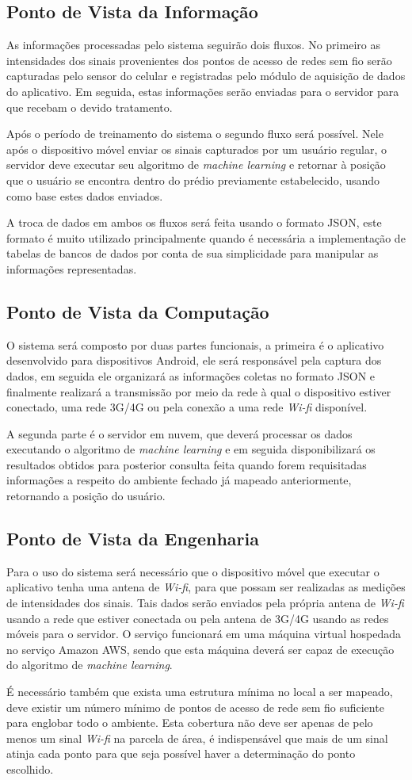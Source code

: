 \subsection{Ponto de Vista da Informação}
As informações processadas pelo sistema seguirão dois fluxos. No primeiro as intensidades dos sinais provenientes dos pontos de acesso de redes sem fio serão capturadas pelo sensor do celular e registradas pelo módulo de aquisição de dados do aplicativo. Em seguida, estas informações serão enviadas para o servidor para que recebam o devido tratamento.\par
Após o período de treinamento do sistema o segundo fluxo será possível. Nele após o dispositivo móvel enviar os sinais capturados por um usuário regular, o servidor deve executar seu algoritmo de \textit{machine learning} e retornar à posição que o usuário se encontra dentro do prédio previamente estabelecido, usando como base estes dados enviados.\par
A troca de dados em ambos os fluxos será feita usando o formato JSON, este formato é muito utilizado principalmente quando é necessária a implementação de tabelas de bancos de dados por conta de sua simplicidade para manipular as informações representadas.
\subsection{Ponto de Vista da Computação}
O sistema será composto por duas partes funcionais, a primeira é o aplicativo desenvolvido para dispositivos Android, ele será responsável pela captura dos dados, em seguida ele organizará as informações coletas no formato JSON e finalmente realizará a transmissão por meio da rede à qual o dispositivo estiver conectado, uma rede 3G/4G ou pela conexão a uma rede \textit{Wi-fi} disponível.\par
A segunda parte é o servidor em nuvem, que deverá processar os dados executando o algoritmo de \textit{machine learning} e em seguida disponibilizará os resultados obtidos para posterior consulta feita quando forem requisitadas informações a respeito do ambiente fechado já mapeado anteriormente, retornando a posição do usuário.
\subsection{Ponto de Vista da Engenharia}
Para o uso do sistema será necessário que o dispositivo móvel que executar o aplicativo tenha uma antena de \textit{Wi-fi}, para que possam ser realizadas as medições de intensidades dos sinais. Tais dados serão enviados pela própria antena de \textit{Wi-fi} usando a rede que estiver conectada ou pela antena de 3G/4G usando as redes móveis para o servidor. O serviço funcionará em uma máquina virtual hospedada no serviço Amazon AWS, sendo que esta máquina deverá ser capaz de execução do algoritmo de \textit{machine learning}.\par
É necessário também que exista uma estrutura mínima no local a ser mapeado, deve existir um número mínimo de pontos de acesso de rede sem fio suficiente para englobar todo o ambiente. Esta cobertura não deve ser apenas de pelo menos um sinal \textit{Wi-fi} na parcela de área, é indispensável que mais de um sinal atinja cada ponto para que seja possível haver a determinação do ponto escolhido.
